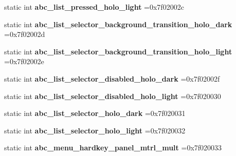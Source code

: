\begin{DoxyCompactItemize}
static int {\bfseries abc\+\_\+list\+\_\+pressed\+\_\+holo\+\_\+light} =0x7f02002c
\item 
\mbox{\label{classandroid_1_1support_1_1v7_1_1cardview_1_1R_1_1drawable_acd205eac6efefa67aa0c52afcdf39cdd}} 
static int {\bfseries abc\+\_\+list\+\_\+selector\+\_\+background\+\_\+transition\+\_\+holo\+\_\+dark} =0x7f02002d
\item 
\mbox{\label{classandroid_1_1support_1_1v7_1_1cardview_1_1R_1_1drawable_a0c4ec95096ae480ca580fff6b7a00c83}} 
static int {\bfseries abc\+\_\+list\+\_\+selector\+\_\+background\+\_\+transition\+\_\+holo\+\_\+light} =0x7f02002e
\item 
\mbox{\label{classandroid_1_1support_1_1v7_1_1cardview_1_1R_1_1drawable_ad5c950063699845f7820f90c1dbe4cb5}} 
static int {\bfseries abc\+\_\+list\+\_\+selector\+\_\+disabled\+\_\+holo\+\_\+dark} =0x7f02002f
\item 
\mbox{\label{classandroid_1_1support_1_1v7_1_1cardview_1_1R_1_1drawable_abc0bd3b7a58e7c29bddd29c079f772a9}} 
static int {\bfseries abc\+\_\+list\+\_\+selector\+\_\+disabled\+\_\+holo\+\_\+light} =0x7f020030
\item 
\mbox{\label{classandroid_1_1support_1_1v7_1_1cardview_1_1R_1_1drawable_ac213f5c18b0264cfa265affa1e0af318}} 
static int {\bfseries abc\+\_\+list\+\_\+selector\+\_\+holo\+\_\+dark} =0x7f020031
\item 
\mbox{\label{classandroid_1_1support_1_1v7_1_1cardview_1_1R_1_1drawable_a3fd307d048be510d7bcb174f0ad5904d}} 
static int {\bfseries abc\+\_\+list\+\_\+selector\+\_\+holo\+\_\+light} =0x7f020032
\item 
\mbox{\label{classandroid_1_1support_1_1v7_1_1cardview_1_1R_1_1drawable_a9822567e939308ef658f7e3110255e8a}} 
static int {\bfseries abc\+\_\+menu\+\_\+hardkey\+\_\+panel\+\_\+mtrl\+\_\+mult} =0x7f020033

\end{DoxyCompactItemize}
